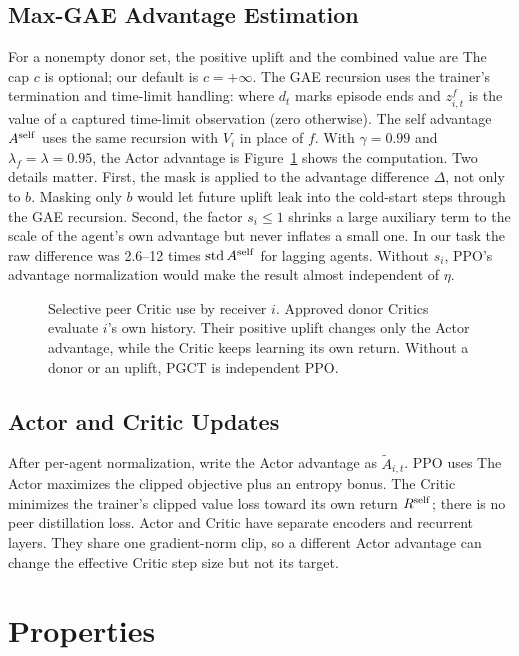 \documentclass{article}
\begin{document}
\subsection{Max-GAE Advantage Estimation}
For a nonempty donor set, the positive uplift and the combined value are
\MaxEquation
The cap $c$ is optional; our default is $c=+\infty$. The GAE recursion uses the trainer's termination and time-limit handling:
\GAEEquation
where $d_t$ marks episode ends and $z^f_{i,t}$ is the value of a captured time-limit observation (zero otherwise). The self advantage $A^{\rm self}$ uses the same recursion with $V_i$ in place of $f$. With $\gamma=0.99$ and $\lambda_f=\lambda=0.95$, the Actor advantage is
\BlendEquation
Figure~\ref{fig:critic} shows the computation. Two details matter. First, the mask is applied to the advantage difference $\Delta$, not only to $b$. Masking only $b$ would let future uplift leak into the cold-start steps through the GAE recursion. Second, the factor $s_i\le1$ shrinks a large auxiliary term to the scale of the agent's own advantage but never inflates a small one. In our task the raw difference was 2.6--12 times $\operatorname{std}A^{\rm self}$ for lagging agents. Without $s_i$, PPO's advantage normalization would make the result almost independent of $\eta$.

\begin{figure}[t]
\centering\resizebox{.97\textwidth}{!}{}
\caption{Selective peer Critic use by receiver $i$. Approved donor Critics evaluate $i$'s own history. Their positive uplift changes only the Actor advantage, while the Critic keeps learning its own return. Without a donor or an uplift, PGCT is independent PPO.}\label{fig:critic}
\end{figure}

\subsection{Actor and Critic Updates}
After per-agent normalization, write the Actor advantage as $\widetilde A_{i,t}$. PPO uses
\PPOEquation
The Actor maximizes the clipped objective plus an entropy bonus. The Critic minimizes the trainer's clipped value loss toward its own return $R^{\rm self}$; there is no peer distillation loss. Actor and Critic have separate encoders and recurrent layers. They share one gradient-norm clip, so a different Actor advantage can change the effective Critic step size but not its target.

\section{Properties}
\end{document}
